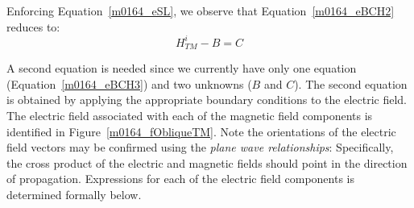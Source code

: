 Enforcing Equation~\ref{m0164_eSL}, we observe that Equation~\ref{m0164_eBCH2} reduces to:
%
\begin{equation}
H^i_{TM} - B = C 
\label{m0164_eBCH3}
\end{equation}

A second equation is needed since we currently have only one equation (Equation~\ref{m0164_eBCH3}) and two unknowns ($B$ and $C$).  
The second equation is obtained by applying the appropriate boundary conditions to the electric field.
The electric field associated with each of the magnetic field components is identified in Figure~\ref{m0164_fObliqueTM}.
Note the orientations of the electric field vectors may be confirmed using the \emph{plane wave relationships}: 
Specifically, the cross product of the electric and magnetic fields should point in the direction of propagation.
Expressions for each of the electric field components is determined formally below.

